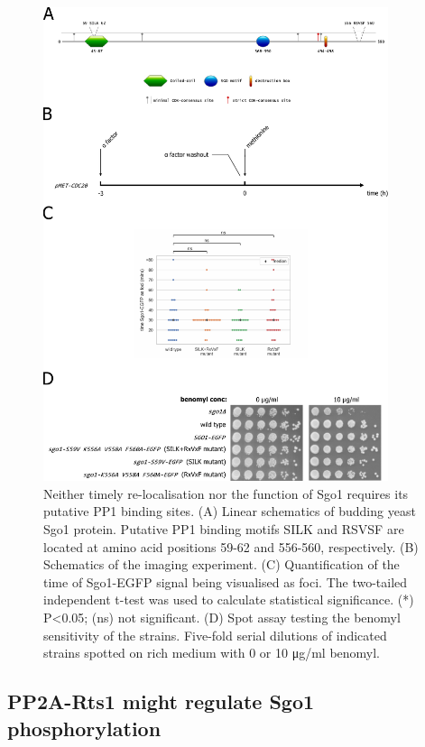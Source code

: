 \begin{figure}[htbp]
  \centering
  \includegraphics[width=0.9\textwidth]{chapter3/figures/Sgo1 putative PP1 binding mutants.pdf}
  \caption[Neither timely re-localisation nor the function of Sgo1 requires its putative PP1 binding sites]{Neither timely re-localisation nor the function of Sgo1 requires its putative PP1 binding sites. (A) Linear schematics of budding yeast Sgo1 protein. Putative PP1 binding motifs SILK and RSVSF are located at amino acid positions 59-62 and 556-560, respectively. (B) Schematics of the imaging experiment. (C) Quantification of the time of Sgo1-EGFP signal being visualised as foci. The two-tailed independent t-test was used to calculate statistical significance. (*) P<0.05; (ns) not significant. (D) Spot assay testing the benomyl sensitivity of the strains. Five-fold serial dilutions of indicated strains spotted on rich medium with 0 or 10 \si{\micro\gram/\milli\litre} benomyl.}
  \label{fig:sgo1phosphomutant}
\end{figure}

\subsection{PP2A-Rts1 might regulate Sgo1 phosphorylation}

